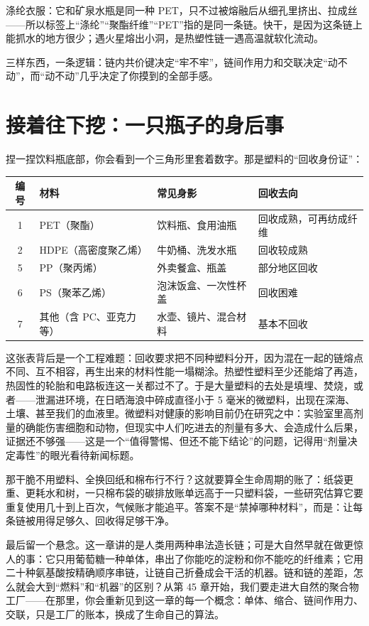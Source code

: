 涤纶衣服：它和矿泉水瓶是同一种 PET，只不过被熔融后从细孔里挤出、拉成丝——所以标签上“涤纶”“聚酯纤维”“PET”指的是同一条链。快干，是因为这条链上能抓水的地方很少；遇火星熔出小洞，是热塑性链一遇高温就软化流动。

三样东西，一条逻辑：链内共价键决定“牢不牢”，链间作用力和交联决定“动不动”，而“动不动”几乎决定了你摸到的全部手感。

\section{接着往下挖：一只瓶子的身后事}

捏一捏饮料瓶底部，你会看到一个三角形里套着数字。那是塑料的“回收身份证”：

\begin{table}[htbp]
\centering
\begin{tabular}{clll}
\toprule
编号 & 材料 & 常见身影 & 回收去向 \\
\midrule
1 & PET（聚酯） & 饮料瓶、食用油瓶 & 回收成熟，可再纺成纤维 \\
2 & HDPE（高密度聚乙烯） & 牛奶桶、洗发水瓶 & 回收较成熟 \\
5 & PP（聚丙烯） & 外卖餐盒、瓶盖 & 部分地区回收 \\
6 & PS（聚苯乙烯） & 泡沫饭盒、一次性杯盖 & 回收困难 \\
7 & 其他（含 PC、亚克力等） & 水壶、镜片、混合材料 & 基本不回收 \\
\bottomrule
\end{tabular}
\end{table}

这张表背后是一个工程难题：回收要求把不同种塑料分开，因为混在一起的链熔点不同、互不相容，再生出来的材料性能一塌糊涂。热塑性塑料至少还能熔了再造，热固性的轮胎和电路板连这一关都过不了。于是大量塑料的去处是填埋、焚烧，或者——泄漏进环境，在日晒海浪中碎成直径小于 5 毫米的微塑料，出现在深海、土壤、甚至我们的血液里。微塑料对健康的影响目前仍在研究之中：实验室里高剂量的确能伤害细胞和动物，但现实中人们吃进去的剂量有多大、会造成什么后果，证据还不够强——这是一个“值得警惕、但还不能下结论”的问题，记得用“剂量决定毒性”的眼光看待新闻标题。

那干脆不用塑料、全换回纸和棉布行不行？这就要算全生命周期的账了：纸袋更重、更耗水和树，一只棉布袋的碳排放账单远高于一只塑料袋，一些研究估算它要重复使用几十到上百次，气候账才能追平。答案不是“禁掉哪种材料”，而是：让每条链被用得足够久、回收得足够干净。

最后留一个悬念。这一章讲的是人类用两种串法造长链；可是大自然早就在做更惊人的事：它只用葡萄糖一种单体，串出了你能吃的淀粉和你不能吃的纤维素；它用二十种氨基酸按精确顺序串链，让链自己折叠成会干活的机器。链和链的差距，怎么就会大到“燃料”和“机器”的区别？从第 45 章开始，我们要走进大自然的聚合物工厂——在那里，你会重新见到这一章的每一个概念：单体、缩合、链间作用力、交联，只是工厂的账本，换成了生命自己的算法。

